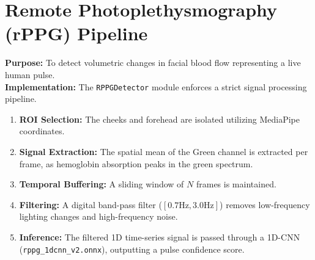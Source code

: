 \section{Remote Photoplethysmography (rPPG) Pipeline}
\textbf{Purpose:} To detect volumetric changes in facial blood flow representing a live human pulse. \\
\textbf{Implementation:} The \texttt{RPPGDetector} module enforces a strict signal processing pipeline.
\begin{enumerate}
    \item \textbf{ROI Selection:} The cheeks and forehead are isolated utilizing MediaPipe coordinates.
    \item \textbf{Signal Extraction:} The spatial mean of the Green channel is extracted per frame, as hemoglobin absorption peaks in the green spectrum.
    \item \textbf{Temporal Buffering:} A sliding window of $N$ frames is maintained.
    \item \textbf{Filtering:} A digital band-pass filter ($[0.7\text{Hz}, 3.0\text{Hz}]$) removes low-frequency lighting changes and high-frequency noise.
    \item \textbf{Inference:} The filtered 1D time-series signal is passed through a 1D-CNN (\texttt{rppg\_1dcnn\_v2.onnx}), outputting a pulse confidence score.
\end{enumerate}

